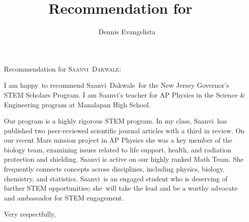 \documentclass[10pt]{letter}
\title{Recommendation for \firstname\ \lastname}
\author{Dennis Evangelista}
\date{}
\newcommand\firstname{Saanvi}
\newcommand\lastname{Dakwale}
\newcommand\subject{she}
\newcommand\adjective{happy}
\begin{document}
\begin{letter}{%
}

\opening{Recommendation for {\scshape\firstname\ \lastname}:}

I am \adjective\ to recommend \firstname\ \lastname\ for the New Jersey Governor's STEM Scholars Program.  I am \firstname's teacher for AP Physics in the Science \& Engineering program at Manalapan High School. 

Our program is a highly rigorous STEM program. In my class, \firstname\ has published two peer-reviewed scientific journal articles with a third in review.  On our recent Mars mission project in AP Physics she was a key member of the biology team, examining issues related to life support, health, and radiation protection and shielding. Saanvi is active on our highly ranked Math Team. She frequently connects concepts across disciplines, including physics, biology, chemistry, and statistics. \firstname\ is an engaged student who is deserving of further STEM opportunities; \subject\ will take the lead and be a worthy advocate and ambassador for STEM engagement. 


\closing{Very respectfully,}

\end{letter}
\end{document}
